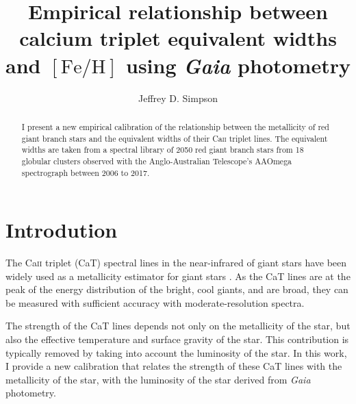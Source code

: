 \documentclass[RNAAS]{aastex63}
\newcommand{\feh}{\ensuremath{[\textrm{Fe}/\textrm{H}]}\xspace}
\newcommand{\gaia}{\textit{Gaia}\xspace}
\begin{document}
\title{Empirical relationship between calcium triplet equivalent widths and \feh  using \gaia photometry}


\author[0000-0002-8165-2507]{Jeffrey D. Simpson}

\begin{abstract}
I present a new empirical calibration of the relationship between the metallicity of red giant branch stars and the equivalent widths of their Ca\textsc{ii} triplet lines. The equivalent widths are taken from a spectral library of 2050 red giant branch stars from 18 globular clusters observed with the Anglo-Australian Telescope's AAOmega spectrograph between 2006 to 2017. 
\end{abstract}


\section{Introdution}

The Ca\textsc{ii} triplet (CaT) spectral lines in the near-infrared of giant stars have been widely used as a metallicity estimator for giant stars \citep[e.g.,][]{Armandroff1991,Carrera2013,Mauro2014,Starkenburg2010,Vasquez2018, Usher2019}.
As the CaT lines are at the peak of the energy distribution of the bright, cool giants, and are broad, they can be measured with sufficient accuracy with moderate-resolution spectra.

The strength of the CaT lines depends not only on the metallicity of the star, but also the effective temperature and surface gravity of the star. This contribution is typically removed by taking into account the luminosity of the star. In this work, I provide a new calibration that relates the strength of these CaT lines with the metallicity of the star, with the luminosity of the star derived from \gaia photometry. 
\end{document}
